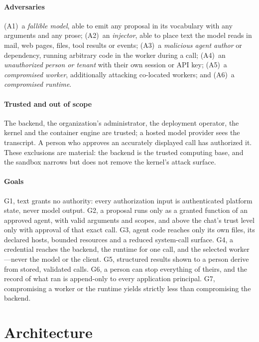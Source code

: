 \documentclass[10pt,twocolumn,a4paper]{article}
\begin{document}
\paragraph{Adversaries}
(A1)~a \emph{fallible model}, able to emit any proposal in its
vocabulary with any arguments and any prose;
(A2)~an \emph{injector}, able to place text the model reads in mail,
web pages, files, tool results or events;
(A3)~a \emph{malicious agent author} or dependency, running arbitrary
code in the worker during a call;
(A4)~an \emph{unauthorized person or tenant} with their own session or
API key;
(A5)~a \emph{compromised worker}, additionally attacking co-located
workers; and
(A6)~a \emph{compromised runtime}.

\paragraph{Trusted and out of scope}
The backend, the organization's administrator, the deployment operator,
the kernel and the container engine are trusted; a hosted model
provider sees the transcript. A person who approves an accurately
displayed call has authorized it. These exclusions are material: the
backend is the trusted computing base, and the sandbox narrows but does
not remove the kernel's attack surface.

\paragraph{Goals}
G1, text grants no authority: every authorization input is
authenticated platform state, never model output.
G2, a proposal runs only as a granted function of an approved agent,
with valid arguments and scopes, and above the chat's trust level only
with approval of that exact call.
G3, agent code reaches only its own files, its declared hosts, bounded
resources and a reduced system-call surface.
G4, a credential reaches the backend, the runtime for one call, and the
selected worker---never the model or the client.
G5, structured results shown to a person derive from stored, validated
calls.
G6, a person can stop everything of theirs, and the record of what ran
is append-only to every application principal.
G7, compromising a worker or the runtime yields strictly less than
compromising the backend.

\section{Architecture}
\label{sec:arch}
\end{document}
